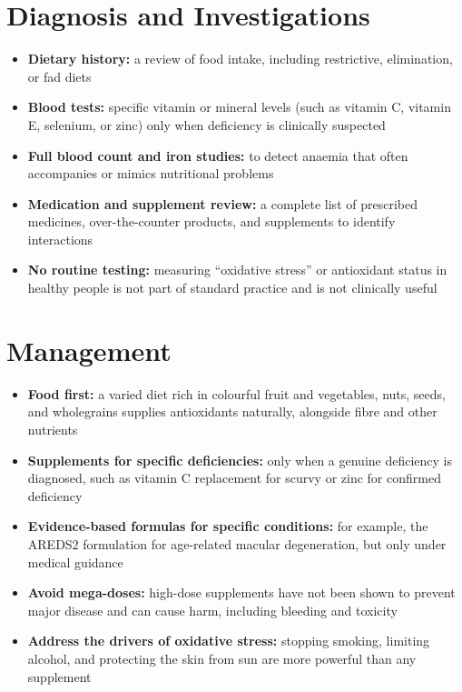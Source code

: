 \section*{Diagnosis and Investigations}
\begin{itemize}
    \item \textbf{Dietary history:} a review of food intake, including restrictive, elimination, or fad diets
    \item \textbf{Blood tests:} specific vitamin or mineral levels (such as vitamin C, vitamin E, selenium, or zinc) only when deficiency is clinically suspected
    \item \textbf{Full blood count and iron studies:} to detect anaemia that often accompanies or mimics nutritional problems
    \item \textbf{Medication and supplement review:} a complete list of prescribed medicines, over-the-counter products, and supplements to identify interactions
    \item \textbf{No routine testing:} measuring ``oxidative stress'' or antioxidant status in healthy people is not part of standard practice and is not clinically useful
\end{itemize}

\section*{Management}
\begin{itemize}
    \item \textbf{Food first:} a varied diet rich in colourful fruit and vegetables, nuts, seeds, and wholegrains supplies antioxidants naturally, alongside fibre and other nutrients
    \item \textbf{Supplements for specific deficiencies:} only when a genuine deficiency is diagnosed, such as vitamin C replacement for scurvy or zinc for confirmed deficiency
    \item \textbf{Evidence-based formulas for specific conditions:} for example, the AREDS2 formulation for age-related macular degeneration, but only under medical guidance
    \item \textbf{Avoid mega-doses:} high-dose supplements have not been shown to prevent major disease and can cause harm, including bleeding and toxicity
    \item \textbf{Address the drivers of oxidative stress:} stopping smoking, limiting alcohol, and protecting the skin from sun are more powerful than any supplement
\end{itemize}


